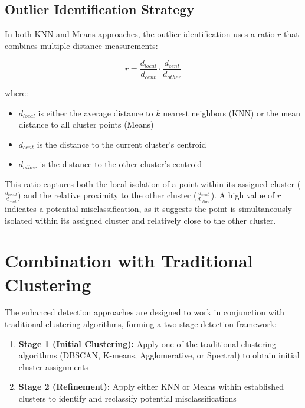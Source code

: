 \subsection{Outlier Identification Strategy}

In both KNN and Means approaches, the outlier identification uses a ratio $r$ that combines multiple distance measurements:

\begin{equation}
    r = \frac{d_{local}}{d_{cent}} \cdot \frac{d_{cent}}{d_{other}}
\end{equation}

where:
\begin{itemize}
    \item $d_{local}$ is either the average distance to $k$ nearest neighbors (KNN) or the mean distance to all cluster points (Means)
    \item $d_{cent}$ is the distance to the current cluster's centroid
    \item $d_{other}$ is the distance to the other cluster's centroid
\end{itemize}

This ratio captures both the local isolation of a point within its assigned cluster ($\frac{d_{local}}{d_{cent}}$) and the relative proximity to the other cluster ($\frac{d_{cent}}{d_{other}}$). A high value of $r$ indicates a potential misclassification, as it suggests the point is simultaneously isolated within its assigned cluster and relatively close to the other cluster.

\section{Combination with Traditional Clustering}

The enhanced detection approaches are designed to work in conjunction with traditional clustering algorithms, forming a two-stage detection framework:

\begin{enumerate}
    \item \textbf{Stage 1 (Initial Clustering):} Apply one of the traditional clustering algorithms (DBSCAN, K-means, Agglomerative, or Spectral) to obtain initial cluster assignments
    
    \item \textbf{Stage 2 (Refinement):} Apply either KNN or Means within established clusters to identify and reclassify potential misclassifications
\end{enumerate}

